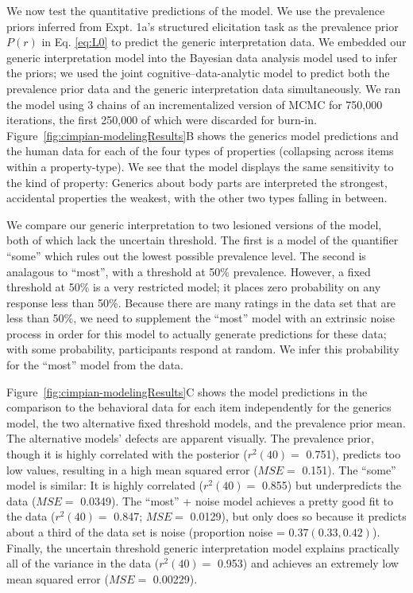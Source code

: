 \documentclass[floatsintext,man]{apa6}
\theoremstyle{definition}
\theoremstyle{definition}
\theoremstyle{definition}
\theoremstyle{remark}
\begin{document}
We now test the quantitative predictions of the model. We use the
prevalence priors inferred from Expt. 1a's structured elicitation task
as the prevalence prior \(P(r)\) in Eq. \ref{eq:L0} to predict the
generic interpretation data. We embedded our generic interpretation
model into the Bayesian data analysis model used to infer the priors; we
used the joint cognitive--data-analytic model to predict both the
prevalence prior data and the generic interpretation data
simultaneously. We ran the model using 3 chains of an incrementalized
version of MCMC for 750,000 iterations, the first 250,000 of which were
discarded for burn-in. Figure~\ref{fig:cimpian-modelingResults}B shows
the generics model predictions and the human data for each of the four
types of properties (collapsing across items within a property-type). We
see that the model displays the same sensitivity to the kind of
property: Generics about body parts are interpreted the strongest,
accidental properties the weakest, with the other two types falling in
between.

We compare our generic interpretation to two lesioned versions of the
model, both of which lack the uncertain threshold. The first is a model
of the quantifier \enquote{some} which rules out the lowest possible
prevalence level. The second is analagous to \enquote{most}, with a
threshold at 50\% prevalence. However, a fixed threshold at 50\% is a
very restricted model; it places zero probability on any response less
than 50\%. Because there are many ratings in the data set that are less
than 50\%, we need to supplement the \enquote{most} model with an
extrinsic noise process in order for this model to actually generate
predictions for these data; with some probability, participants respond
at random. We infer this probability for the \enquote{most} model from
the data.

Figure~\ref{fig:cimpian-modelingResults}C shows the model predictions in
the comparison to the behavioral data for each item independently for
the generics model, the two alternative fixed threshold models, and the
prevalence prior mean. The alternative models' defects are apparent
visually. The prevalence prior, though it is highly correlated with the
posterior (\(r^2(40)=\) 0.751), predicts too low values, resulting in a
high mean squared error (\(MSE=\) 0.151). The \enquote{some} model is
similar: It is highly correlated (\(r^2(40)=\) 0.855) but underpredicts
the data (\(MSE=\) 0.0349). The \enquote{most} + noise model achieves a
pretty good fit to the data (\(r^2(40) =\) 0.847; \(MSE=\) 0.0129), but
only does so because it predicts about a third of the data set is noise
(proportion noise = \(0.37 (0.33, 0.42)\)). Finally, the uncertain
threshold generic interpretation model explains practically all of the
variance in the data (\(r^2(40) =\) 0.953) and achieves an extremely low
mean squared error (\(MSE =\) 0.00229).
\end{document}
